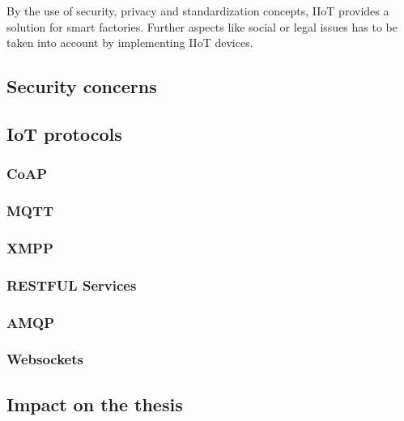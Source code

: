 By the use of security, privacy and standardization concepts, IIoT provides a solution for smart factories. Further aspects like social or legal issues has to be taken into account by implementing IIoT devices\cite{iiot}.

\subsection{Security concerns}

\subsection{IoT protocols}

\subsubsection{CoAP}

\subsubsection{MQTT}

\subsubsection{XMPP}

\subsubsection{RESTFUL Services}

\subsubsection{AMQP}

\subsubsection{Websockets}

\subsection{Impact on the thesis}
